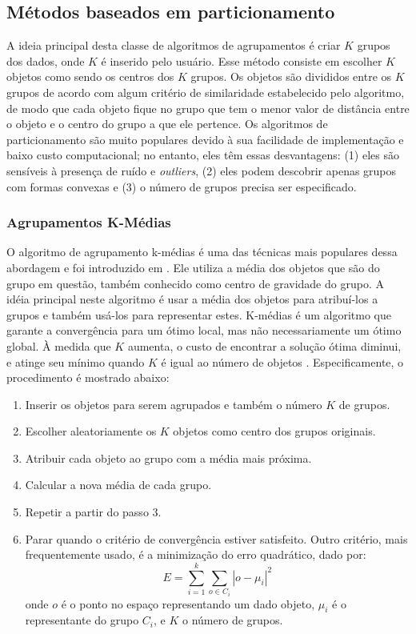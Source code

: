 \subsection{Métodos baseados em particionamento}
A ideia principal desta classe de algoritmos de agrupamentos é criar ${K}$ grupos dos dados, onde ${K}$ é inserido pelo usuário.
Esse método consiste em escolher ${K}$ objetos como sendo os centros dos ${K}$ grupos.
Os objetos são divididos entre os ${K}$ grupos de acordo com algum critério de similaridade
estabelecido pelo algoritmo, de modo que cada objeto fique no grupo que tem o menor valor de
distância entre o objeto e o centro do grupo a que ele pertence.
Os algoritmos de particionamento são muito populares devido à sua facilidade de implementação e baixo custo computacional; no entanto, eles têm essas desvantagens: (1) eles são sensíveis à presença de ruído e \textit{outliers}, (2) eles podem descobrir apenas grupos com formas convexas e (3) o número de grupos precisa ser especificado.

\subsubsection{Agrupamentos K-Médias}
O algoritmo de agrupamento k-médias é uma das técnicas mais populares dessa abordagem e foi introduzido em \cite{Macqueen67}. Ele utiliza a média dos objetos que são do grupo em questão, também conhecido como centro de gravidade do grupo.  A idéia principal neste algoritmo é usar a média dos objetos para atribuí-los a grupos e também usá-los para  representar estes.
K-médias é um algoritmo que garante a convergência para um ótimo local, mas não necessariamente um ótimo global. À medida que ${K}$ aumenta, o custo de encontrar a solução ótima diminui, e atinge seu mínimo quando ${K}$ é igual ao número de objetos \cite{Wu2008}. Especificamente, o procedimento é mostrado abaixo:
 \begin{enumerate}
	\item Inserir os objetos para serem agrupados e também o número ${K}$ de grupos.
	\item Escolher aleatoriamente os ${K}$ objetos como centro dos grupos originais.
	\item Atribuir cada objeto ao grupo com a média mais próxima.
	\item Calcular a nova média de cada grupo.
	\item Repetir a partir do passo 3.
	\item Parar quando o critério de convergência estiver satisfeito. Outro critério, mais frequentemente usado, é a minimização do erro quadrático, dado por: 
	\begin{equation}
	E = \sum_{i=1}^{k}\sum_{o\in C_{i}} |o - \mu_{i}|^{2}
	\end{equation}
	onde ${o}$ é o ponto no espaço representando um dado objeto, ${\mu_{i}}$ é o representante do grupo ${C_{i}}$,
	 e ${K}$ o número de grupos.
\end{enumerate}


